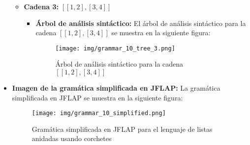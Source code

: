 \documentclass[11pt]{report}
\begin{document}
\begin{itemize}
\begin{itemize}
    \newpage

    \item \textbf{Cadena 3:} $[[1,2],[3,4]]$
    \begin{itemize}
      \item \textbf{Árbol de análisis sintáctico:} El árbol de análisis sintáctico para la cadena $[[1,2],[3,4]]$ se muestra en la siguiente figura:
      \begin{figure}[H]
        \centering
        \texttt{[image: img/grammar\_10\_tree\_3.png]}
        \caption{Árbol de análisis sintáctico para la cadena $[[1,2],[3,4]]$}
        \label{fig:arbol30}
      \end{figure}
    \end{itemize}
  \end{itemize}

  \newpage

  \item \textbf{Imagen de la gramática simplificada en JFLAP:} La gramática simplificada en JFLAP se muestra en la siguiente figura:
  \begin{figure}[H]
    \centering
    \texttt{[image: img/grammar\_10\_simplified.png]}
    \caption{Gramática simplificada en JFLAP para el lenguaje de listas anidadas usando corchetes}
    \label{fig:gramatica10_simplified}
  \end{figure}
\end{itemize}
\end{document}
